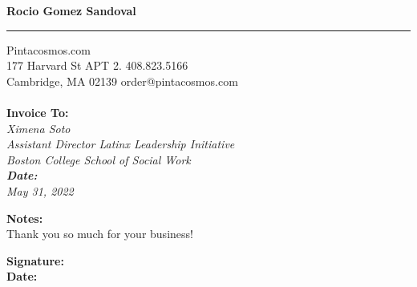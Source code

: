 \documentclass{invoice}
\def \tab {\hspace*{3ex}}
\begin{document}
\hfil{\Huge\bf Rocio Gomez Sandoval}\hfil
\bigskip\break
\hrule
Pintacosmos.com \\
177 Harvard St APT 2. \hfill 408.823.5166 \\
Cambridge, MA 02139 \hfill order@pintacosmos.com
\\ \\
{\bf Invoice To:} \\
\tab \em{Ximena Soto} \\
\tab Assistant Director Latinx Leadership Initiative \\
\tab Boston College School of Social Work \\

{\bf Date:} \\
\tab May 31, 2022 \\


\begin{invoiceTable}
\end{invoiceTable}

{\bf Notes:} \\
\tab Thank you so much for your business!

\bigskip
\bigskip
\bigskip
\bigskip
\bigskip

{\bf Signature:} \\
\bigskip
{\bf Date:} \\
\end{document}
